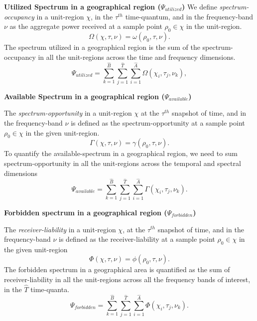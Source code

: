 \documentclass[journal,12pt,draftclsnofoot,onecolumn]{IEEEtran}
\begin{document}
\noindent
\textbf{Utilized Spectrum in a geographical region ($\Psi_{utilized}$)}
We define \textit{spectrum-occupancy} in a unit-region $\chi$, in the ${\tau}^{th}$ time-quantum, and in the frequency-band $\nu$ as the aggregate power received at a sample point $\rho_0 \in \chi$ in the unit-region. 
\begin{equation}
\label{eq:urspoc}
\Omega(\chi, \tau, \nu) = \omega({\rho_0}, \tau, \nu) .
\end{equation}
The spectrum utilized in a geographical region is the sum of the spectrum-occupancy in all the unit-regions across the time and frequency dimensions.
\begin{equation}
\label{eq:agsput}
\Psi_{utilized} = \sum_{k=1}^{\hat{B}} \sum_{j=1}^{\hat{T}} \sum_{i=1}^{\hat{A}} {\Omega}(\chi_i, \tau_j, \nu_k) ,
\end{equation}

\noindent
\textbf{Available Spectrum in a geographical region ($\Psi_{available}$)}

The \textit{spectrum-opportunity} in a unit-region $\chi$ at the ${\tau}^{th}$ snapshot of time, and in the frequency-band $\nu$ is defined as the spectrum-opportunity at a sample point $\rho_0 \in \chi$ in the given unit-region. 
\begin{equation}
\label{eq:urspop}
{\Gamma}(\chi, \tau, \nu) = \gamma(\rho_0, \tau, \nu) .\end{equation}
To quantify the available-spectrum in a geographical region, we need to sum spectrum-opportunity in all the unit-regions across the temporal and spectral dimensions
\begin{equation}
\label{eq:agspav}
\Psi_{available} = \sum_{k=1}^{\hat{B}} \sum_{j=1}^{\hat{T}} \sum_{i=1}^{\hat{A}} {\Gamma}(\chi_i, \tau_j, \nu_k) .
\end{equation}

\noindent
\textbf{Forbidden spectrum in a geographical region ($\Psi_{forbidden}$)}

The \textit{receiver-liability} in a unit-region $\chi$, at the ${\tau}^{th}$ snapshot of time, and in the frequency-band $\nu$  is defined as the receiver-liability at a sample point $\rho_0 \in \chi$ in the given unit-region 
\begin{equation}
\label{eq:urspfb}
{\Phi}(\chi, \tau, \nu) = \phi(\rho_0, \tau, \nu) . \end{equation}
The forbidden spectrum in a geographical area is quantified as the sum of receiver-liability in all the unit-regions across all the frequency bands of interest, in the $\hat{T}$ time-quanta.
\begin{equation}
\label{eq:agspfb}
\Psi_{forbidden} = \sum_{k=1}^{\hat{B}} \sum_{j=1}^{\hat{T}} \sum_{i=1}^{\hat{A}} {\Phi}(\chi_i, \tau_j, \nu_k) .
\end{equation}
\end{document}
